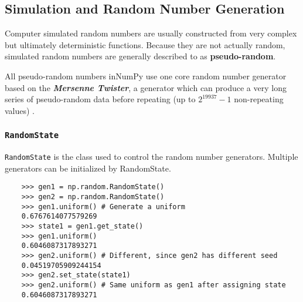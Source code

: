 \documentclass[KSmain.tex]{subfiles}
\begin{document}
%


\newpage

\subsection{Simulation and Random Number Generation}
Computer simulated random numbers are usually constructed from very complex but ultimately deterministic
functions. Because they are not actually random, simulated random numbers are generally described
to as \textbf{pseudo-random}. 

All pseudo-random numbers inNumPy use one core random number generator
based on the \textbf{\textit{Mersenne Twister}}, a generator which can produce a very long series of pseudo-random
data before repeating (up to $2^19937 - 1$ non-repeating values)
.
\subsubsection{\texttt{RandomState}}
\texttt{RandomState} is the class used to control the random number generators. Multiple generators can be initialized
by RandomState.
\begin{framed}
	\begin{verbatim}
	>>> gen1 = np.random.RandomState()
	>>> gen2 = np.random.RandomState()
	>>> gen1.uniform() # Generate a uniform
	0.6767614077579269
	>>> state1 = gen1.get_state()
	>>> gen1.uniform()
	0.6046087317893271
	>>> gen2.uniform() # Different, since gen2 has different seed
	0.04519705909244154
	>>> gen2.set_state(state1)
	>>> gen2.uniform() # Same uniform as gen1 after assigning state
	0.6046087317893271
	\end{verbatim}
\end{framed}
\end{document}
